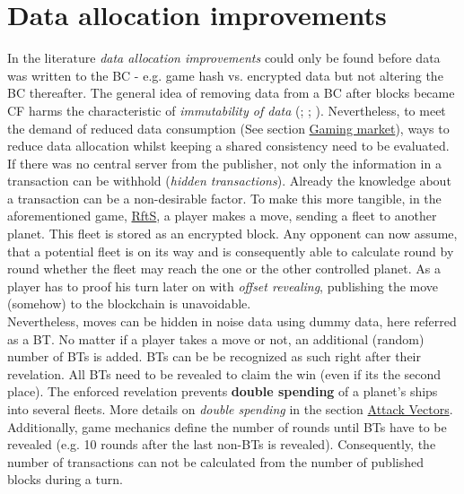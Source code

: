 \FloatBarrier

\section{Data allocation improvements}
\label{sec:DataAllocationImprovements}
In the literature \textit{data allocation improvements} could only be found before
data was written to the \gls{BC} - e.g. game hash vs. encrypted data \cite[94]{Kraft.2016} but not altering the \gls{BC} thereafter.
The general idea of removing data from a \gls{BC} after blocks became \gls{CF} harms the characteristic of \textit{immutability of data} (\citet[17-18]{Butijn.2020}; \citet[57]{Dib.2018}; \citet[21]{Sharma.2020}).
Nevertheless, to meet the demand of reduced data consumption (See section \hyperref[sec:GamingMarket]{Gaming market}),
ways to reduce data allocation whilst keeping a shared consistency need to be evaluated. \\
If there was no central server from the publisher, not only the information in a transaction can be withhold (\textit{hidden transactions}).
Already the knowledge about a transaction can be a non-desirable factor.
To make this more tangible, in the aforementioned game, \hyperref[def:RftS]{RftS}, a player makes a move, sending a fleet to another planet.
This fleet is stored as an encrypted block.
Any opponent can now assume, that a potential fleet is on its way and is consequently able to
calculate round by round whether the fleet may reach the one or the other controlled planet.
As a player has to proof his turn later on with \textit{offset revealing}, publishing the move (somehow) to the blockchain is unavoidable. \\
Nevertheless, moves can be hidden in noise data using dummy data, here referred as a \gls{BT}. \label{def:BloatTransactions}
No matter if a player takes a move or not, an additional (random) number of \gls{BT}s is added.
\gls{BT}s can be be recognized as such right after their revelation.
All \gls{BT}s need to be revealed to claim the win (even if its the second place).
The enforced revelation prevents \textbf{double spending} of a planet's ships into several fleets.
More details on \textit{double spending} in the section \hyperref[sec:AttackVectors]{Attack Vectors}. \\
Additionally, game mechanics define the number of rounds until \gls{BT}s
have to be revealed (e.g. 10 rounds after the last non-\gls{BT}s is revealed).
Consequently, the number of transactions can not be calculated from the number of published blocks during a turn.
